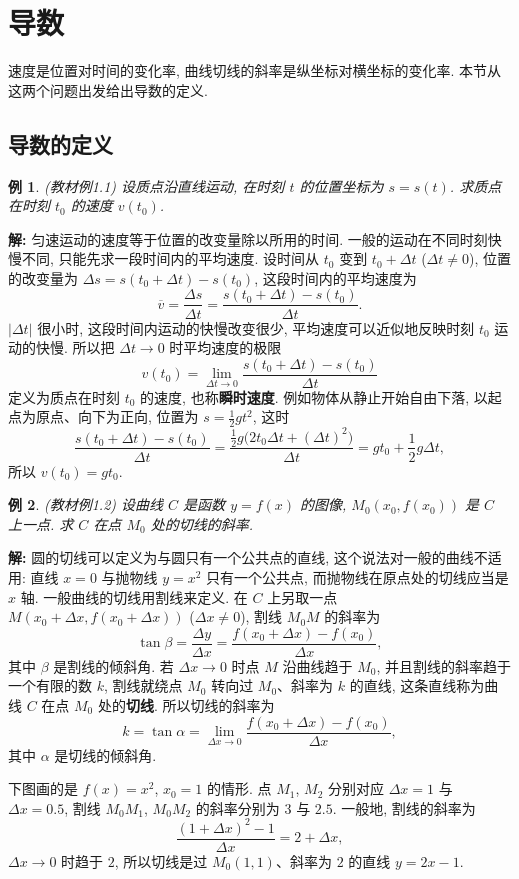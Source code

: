 \documentclass[UTF8,openany]{ctexbook}
\theoremstyle{chinesetextbook}
\newtheorem{example}{例}[section]
\newenvironment{cnsolution}{\par\indent\textbf{解:} \ignorespaces}{\par}
\begin{document}
\section{导数}
速度是位置对时间的变化率, 曲线切线的斜率是纵坐标对横坐标的变化率. 本节从这两个问题出发给出导数的定义.
\subsection{导数的定义}
\begin{example}\label{ex:c2-1-1}
\textnormal{(教材例1.1)} 设质点沿直线运动, 在时刻 $t$ 的位置坐标为 $s=s(t)$. 求质点在时刻 $t_0$ 的速度 $v(t_0)$.
\end{example}
\begin{cnsolution}
匀速运动的速度等于位置的改变量除以所用的时间. 一般的运动在不同时刻快慢不同, 只能先求一段时间内的平均速度. 设时间从 $t_0$ 变到 $t_0+\Delta t$ ($\Delta t\ne0$), 位置的改变量为 $\Delta s=s(t_0+\Delta t)-s(t_0)$, 这段时间内的平均速度为
\[
\overline v=\frac{\Delta s}{\Delta t}=\frac{s(t_0+\Delta t)-s(t_0)}{\Delta t}.
\]
$|\Delta t|$ 很小时, 这段时间内运动的快慢改变很少, 平均速度可以近似地反映时刻 $t_0$ 运动的快慢. 所以把 $\Delta t\to0$ 时平均速度的极限
\[
v(t_0)=\lim_{\Delta t\to0}\frac{s(t_0+\Delta t)-s(t_0)}{\Delta t}
\]
定义为质点在时刻 $t_0$ 的速度, 也称\textbf{瞬时速度}. 例如物体从静止开始自由下落, 以起点为原点、向下为正向, 位置为 $\displaystyle s=\frac12gt^2$, 这时
\[
\frac{s(t_0+\Delta t)-s(t_0)}{\Delta t}=\frac{\frac12g\bigl(2t_0\Delta t+(\Delta t)^2\bigr)}{\Delta t}=gt_0+\frac12g\Delta t,
\]
所以 $v(t_0)=gt_0$.
\end{cnsolution}
\begin{example}\label{ex:c2-1-2}
\textnormal{(教材例1.2)} 设曲线 $C$ 是函数 $y=f(x)$ 的图像, $M_0(x_0,f(x_0))$ 是 $C$ 上一点. 求 $C$ 在点 $M_0$ 处的切线的斜率.
\end{example}
\begin{cnsolution}
圆的切线可以定义为与圆只有一个公共点的直线, 这个说法对一般的曲线不适用: 直线 $x=0$ 与抛物线 $y=x^2$ 只有一个公共点, 而抛物线在原点处的切线应当是 $x$ 轴. 一般曲线的切线用割线来定义. 在 $C$ 上另取一点 $M(x_0+\Delta x,f(x_0+\Delta x))$ ($\Delta x\ne0$), 割线 $M_0M$ 的斜率为
\[
\tan\beta=\frac{\Delta y}{\Delta x}=\frac{f(x_0+\Delta x)-f(x_0)}{\Delta x},
\]
其中 $\beta$ 是割线的倾斜角. 若 $\Delta x\to0$ 时点 $M$ 沿曲线趋于 $M_0$, 并且割线的斜率趋于一个有限的数 $k$, 割线就绕点 $M_0$ 转向过 $M_0$、斜率为 $k$ 的直线, 这条直线称为曲线 $C$ 在点 $M_0$ 处的\textbf{切线}. 所以切线的斜率为
\[
k=\tan\alpha=\lim_{\Delta x\to0}\frac{f(x_0+\Delta x)-f(x_0)}{\Delta x},
\]
其中 $\alpha$ 是切线的倾斜角.

下图画的是 $f(x)=x^2$, $x_0=1$ 的情形. 点 $M_1$, $M_2$ 分别对应 $\Delta x=1$ 与 $\Delta x=0.5$, 割线 $M_0M_1$, $M_0M_2$ 的斜率分别为 $3$ 与 $2.5$. 一般地, 割线的斜率为
\[
\frac{(1+\Delta x)^2-1}{\Delta x}=2+\Delta x,
\]
$\Delta x\to0$ 时趋于 $2$, 所以切线是过 $M_0(1,1)$、斜率为 $2$ 的直线 $y=2x-1$.
\end{cnsolution}
\end{document}

